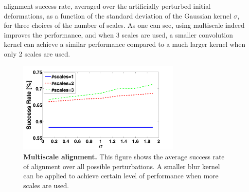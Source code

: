\documentclass[12pt,journal,draftcls,letterpaper,onecolumn]{IEEEtran}
\providecommand{\DIFaddbeginFL}{} %
\providecommand{\DIFaddendFL}{} %
\begin{document}
alignment success rate, averaged over the artificially
perturbed initial deformations, as a function of the
standard deviation of the Gaussian kernel $\sigma$, for
three choices of the number of scales. As one can see,
using multiscale indeed improves the performance, and when
3 scales are used, a smaller convolution kernel can achieve
a similar performance compared to a much larger kernel when
only 2 scales are used.
\begin{figure}
\centering
\includegraphics[height=1.8in]{figures_pami/multiscale.png}
\DIFaddbeginFL \vspace{-.3in}
\DIFaddendFL \caption{{\bf Multiscale alignment.} This figure shows the average success rate of alignment over all possible perturbations. A smaller blur kernel can be applied to achieve certain level of performance when more scales are used.}
\label{fig:multiscale}
\vspace{-.5in}
\end{figure}
\end{document}
